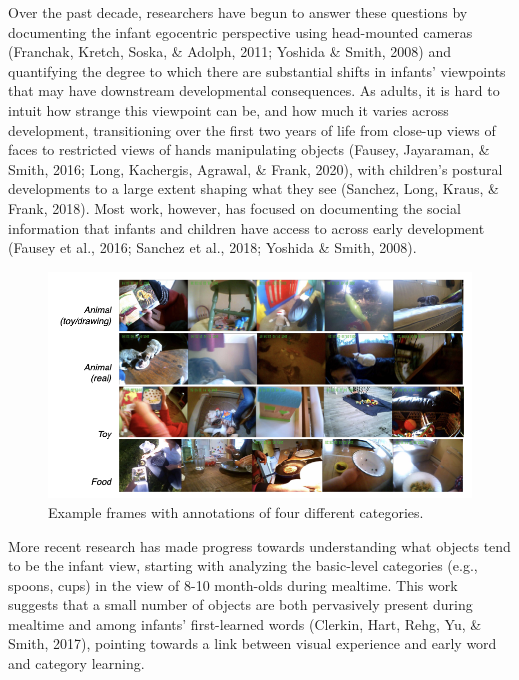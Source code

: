 \documentclass[10pt, letterpaper]{article}
\newenvironment{CodeChunk}{}{}
\begin{document}
Over the past decade, researchers have begun to answer these questions
by documenting the infant egocentric perspective using head-mounted
cameras (Franchak, Kretch, Soska, \& Adolph, 2011; Yoshida \& Smith,
2008) and quantifying the degree to which there are substantial shifts
in infants' viewpoints that may have downstream developmental
consequences. As adults, it is hard to intuit how strange this viewpoint
can be, and how much it varies across development, transitioning over
the first two years of life from close-up views of faces to restricted
views of hands manipulating objects (Fausey, Jayaraman, \& Smith, 2016;
Long, Kachergis, Agrawal, \& Frank, 2020), with children's postural
developments to a large extent shaping what they see (Sanchez, Long,
Kraus, \& Frank, 2018). Most work, however, has focused on documenting
the social information that infants and children have access to across
early development (Fausey et al., 2016; Sanchez et al., 2018; Yoshida \&
Smith, 2008).

\begin{CodeChunk}
\begin{figure}[h]

{\centering \includegraphics[width=\textwidth]{figs/examples-1} 

}

\caption[Example frames with annotations of four different categories]{Example frames with annotations of four different categories.}\label{fig:examples}
\end{figure}
\end{CodeChunk}

More recent research has made progress towards understanding what
objects tend to be the infant view, starting with analyzing the
basic-level categories (e.g., spoons, cups) in the view of 8-10
month-olds during mealtime. This work suggests that a small number of
objects are both pervasively present during mealtime and among infants'
first-learned words (Clerkin, Hart, Rehg, Yu, \& Smith, 2017), pointing
towards a link between visual experience and early word and category
learning.
\end{document}
